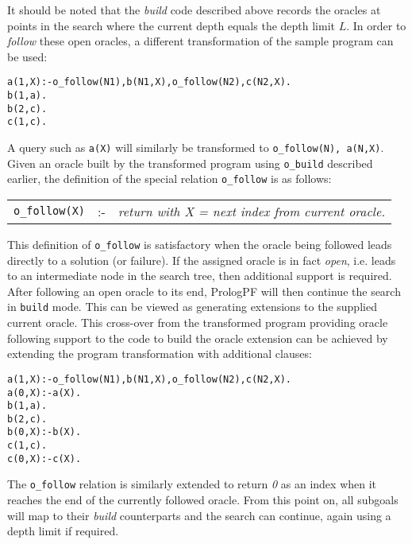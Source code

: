 It should be noted that the \textit{build} code described above records the oracles at
points in the search where the current depth equals the depth limit $L$.  In order to
\textit{follow} these open oracles, a different transformation of the sample program
can be used:
\begin{alltt}
% FOLLOW code\vspace{2mm}
a(1,X) :- o_follow(N1), b(N1,X), o_follow(N2), c(N2,X).\vspace{2mm}
b(1,a).
b(2,c).\vspace{2mm}
c(1,c).
\end{alltt}
A query such as \texttt{a(X)} will similarly be transformed to \texttt{o\_{}follow(N), a(N,X)}.
Given an oracle built by the transformed program using \texttt{o\_{}build} described earlier, the
definition of the special relation \texttt{o\_{}follow} is as follows:\\
\begin{tabular}{l l l}
\texttt{o\_{}follow(X)}   & :- & \textit{return with X = next index from current oracle.}
\end{tabular}

This definition of \texttt{o\_{}follow} is satisfactory when the oracle being followed leads
directly to a solution (or failure).  If the assigned oracle is in fact \textit{open}, i.e. leads
to an intermediate node in the search tree, then additional support is required.  After following an
open oracle to its end, PrologPF will then continue the search in \texttt{build} mode.  This can
be viewed as generating extensions to the supplied current oracle.  This cross-over from the
transformed program providing oracle following support to the code to build the oracle extension
can be achieved by extending the program transformation with additional clauses:
\begin{alltt}
% FOLLOW code\vspace{2mm}
a(1,X) :- o_follow(N1), b(N1,X), o_follow(N2), c(N2,X).
a(0,X) :- a(X).  % crossover clause\vspace{2mm}
b(1,a).
b(2,c).
b(0,X) :- b(X).  % crossover clause\vspace{2mm}
c(1,c).
c(0,X) :- c(X).  % crossover clause
\end{alltt}
The \texttt{o\_{}follow} relation is similarly extended to return \textit{0} as an index
when it reaches the end of the currently followed oracle.  From this point on, all subgoals will
map to their \textit{build} counterparts and the search can continue, again using a depth limit
if required.


